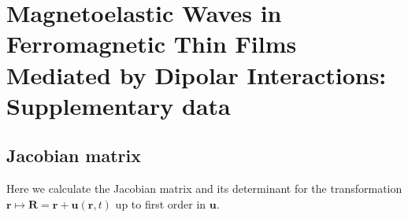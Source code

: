 \clearpage
\onecolumngrid
\setcounter{equation}{0}
\renewcommand{\theequation}{S\arabic{equation}}

\section*{Magnetoelastic Waves in Ferromagnetic Thin Films Mediated by Dipolar Interactions: Supplementary data}


\subsection{Jacobian matrix}
\label{sec:Jacobian}

Here we calculate the Jacobian matrix and its determinant for the transformation $\bm{r}\mapsto\bm{R}=\bm{r}+\bm{u}(\bm{r},t)$ up to first order in $\bm{u}$.

